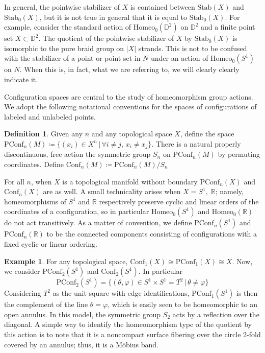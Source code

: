 \documentclass[10pt, oneside]{article}
\newcommand{\R}{\mathbb{R}}
\newcommand{\D}{\mathbb{D}}
\newcommand{\homeo}[1][S^1]{\text{Homeo}_0(#1)}
\newcommand{\conf}[2][S^1]{\text{Conf}_{#2}(#1)}
\newcommand{\pconf}[2][S^1]{\text{PConf}_{#2}(#1)}
\newcommand{\stab}[1]{\text{Stab}(#1)}
\newcommand{\pstab}[1]{\text{Stab}_0(#1)}
\theoremstyle{definition}
\newtheorem{defn}{Definition}[section]
\newtheorem{eg}{Example}[section]
\theoremstyle{definition}
\begin{document}
In general, the pointwise stabilizer of $X$ is contained between $\stab{X}$ and $\pstab{X}$, but it is not true in general that it is equal to $\pstab{X}$. For example, consider the standard action of $\homeo[\D^2]$ on $\D^2$ and a finite point set $X\subset \D^2$. The quotient of the pointwise stabilizer of $X$ by $\pstab{X}$ is isomorphic to the pure braid group on $|X|$ strands. This is not to be confused with the stabilizer of a point or point set in $N$ under an action of $\homeo$ on $N$. When this is, in fact, what we are referring to, we will clearly clearly indicate it. 

Configuration spaces are central to the study of homeomorphism group actions. We adopt the following notational conventions for the spaces of configurations of labeled and unlabeled points.

\begin{defn}
    Given any $n$ and any topological space $X$, define the space $\pconf[M]{n} \coloneqq \{(x_i)\in X^n \,\vert\, \forall i\neq j,\, x_i\neq x_j\}$.
    There is a natural properly discontinuous, free action the symmetric group $S_n$ on $\pconf[M]{n}$ by permuting coordinates. Define $\conf[M]{n}\coloneqq \pconf[M]{n}/S_n$
\end{defn}

For all $n$, when $X$ is a topological manifold without boundary $\pconf[X]{n}$ and $\conf[X]{n}$ are as well. A small technicality arises when $X=S^1,\; \R$; namely, homeomorphisms of $S^1$ and $\R$ respectively preserve cyclic and linear orders of the coordinates of a configuration, so in particular $\homeo$ and $\homeo[\R]$ do not act transitively. As a matter of convention, we define $\pconf[S^1]{n}$ and $\pconf[\R]{n}$ to be the connected components consisting of configurations with a fixed cyclic or linear ordering. 

\begin{eg}\label{eg:confcompute}
    For any topological space, $\conf[X]{1}\cong\pconf[X]{1}\cong X$. Now, we consider $\pconf[S^1]{2}$ and $\conf[S^1]{2}$. In particular
    $$\pconf[S^1]{2} = \{(\theta, \varphi)\in S^1\times S^1 = T^2\,\vert\, \theta\neq\varphi\}$$ Considering $T^2$ as the unit square with edge identifications, $\pconf[S^1]{1}$ is then the complement of the line $\theta=\varphi$, which is easily seen to be homeomorphic to an open annulus. In this model, the symmetric group $S_2$ acts by a reflection over the diagonal. A simple way to identify the homeomorphism type of the quotient by this action is to note that it is a noncompact surface fibering over the circle 2-fold covered by an annulus; thus, it is a M\"{o}bius band\cite{morton:SymmetricProducts}.
\end{eg}
\end{document}
